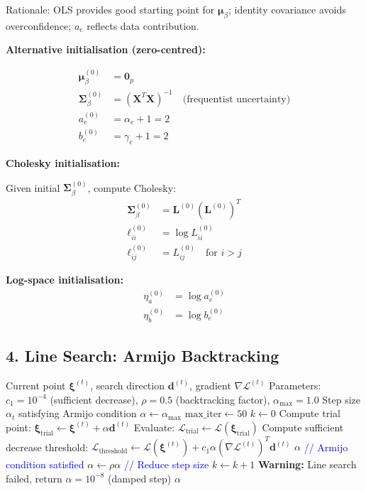 \documentclass[11pt,a4paper]{article}
\begin{document}
Rationale: OLS provides good starting point for $\bm{\mu}_\beta$; identity covariance avoids overconfidence; $a_e$ reflects data contribution.

\textbf{Alternative initialisation (zero-centred):}

\begin{align}
\bm{\mu}_\beta^{(0)} &= \bm{0}_p\\
\bm{\Sigma}_\beta^{(0)} &= (\bm{X}^T \bm{X})^{-1} \quad \text{(frequentist uncertainty)}\\
a_e^{(0)} &= \alpha_e + 1 = 2\\
b_e^{(0)} &= \gamma_e + 1 = 2
\end{align}

\textbf{Cholesky initialisation:}

Given initial $\bm{\Sigma}_\beta^{(0)}$, compute Cholesky:
\begin{align}
\bm{\Sigma}_\beta^{(0)} &= \bm{L}^{(0)} (\bm{L}^{(0)})^T\\
\ell_{ii}^{(0)} &= \log L_{ii}^{(0)}\\
\ell_{ij}^{(0)} &= L_{ij}^{(0)} \quad \text{for } i > j
\end{align}

\textbf{Log-space initialisation:}
\begin{align}
\eta_a^{(0)} &= \log a_e^{(0)}\\
\eta_b^{(0)} &= \log b_e^{(0)}
\end{align}

\subsection*{4. Line Search: Armijo Backtracking}

\begin{algorithm}[H]
\caption{Armijo Backtracking Line Search}
\begin{algorithmic}[1]
\REQUIRE Current point $\bm{\xi}^{(t)}$, search direction $\bm{d}^{(t)}$, gradient $\nabla \mathcal{L}^{(t)}$
\REQUIRE Parameters: $c_1 = 10^{-4}$ (sufficient decrease), $\rho = 0.5$ (backtracking factor), $\alpha_{\max} = 1.0$
\ENSURE Step size $\alpha_t$ satisfying Armijo condition
\STATE $\alpha \leftarrow \alpha_{\max}$
\STATE $\text{max\_iter} \leftarrow 50$
\STATE $k \leftarrow 0$
    \STATE Compute trial point: $\bm{\xi}_{\text{trial}} \leftarrow \bm{\xi}^{(t)} + \alpha \bm{d}^{(t)}$
    \STATE Evaluate: $\mathcal{L}_{\text{trial}} \leftarrow \mathcal{L}(\bm{\xi}_{\text{trial}})$
    \STATE Compute sufficient decrease threshold: $\mathcal{L}_{\text{threshold}} \leftarrow \mathcal{L}(\bm{\xi}^{(t)}) + c_1 \alpha (\nabla \mathcal{L}^{(t)})^T \bm{d}^{(t)}$
        \RETURN $\alpha$ \quad \textcolor{blue}{// Armijo condition satisfied}
    \ENDIF
    \STATE $\alpha \leftarrow \rho \alpha$ \quad \textcolor{blue}{// Reduce step size}
    \STATE $k \leftarrow k + 1$
\ENDWHILE
\STATE \textbf{Warning:} Line search failed, return $\alpha = 10^{-8}$ (damped step)
\RETURN $\alpha$
\end{algorithmic}
\end{algorithm}
\end{document}

